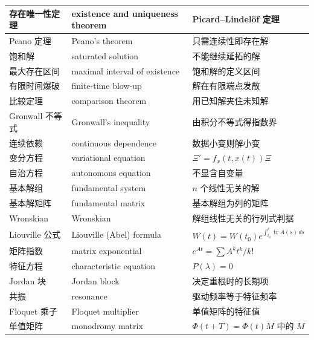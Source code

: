 \documentclass[UTF8,11pt,a4paper]{ctexart}
\begin{document}
\begin{longtable}{@{}>{\raggedright\arraybackslash}p{2.9cm}>{\raggedright\arraybackslash}p{4.7cm}>{\raggedright\arraybackslash}p{7.0cm}@{}}
存在唯一性定理 & existence and uniqueness theorem & Picard--Lindel\"of 定理 \\
\hline
Peano 定理 & Peano's theorem & 只需连续性即存在解 \\
\hline
饱和解 & saturated solution & 不能继续延拓的解 \\
最大存在区间 & maximal interval of existence & 饱和解的定义区间 \\
\hline
有限时间爆破 & finite-time blow-up & 解在有限端点发散 \\
\hline
比较定理 & comparison theorem & 用已知解夹住未知解 \\
\hline
Gronwall 不等式 & Gronwall's inequality & 由积分不等式得指数界 \\
\hline
连续依赖 & continuous dependence & 数据小变则解小变 \\
\hline
变分方程 & variational equation & $\Xi'=f_x(t,x(t))\Xi$ \\
自治方程 & autonomous equation & 不显含自变量 \\
\hline
\hline
基本解组 & fundamental system & $n$ 个线性无关的解 \\
基本解矩阵 & fundamental matrix & 基本解组为列的矩阵 \\
\hline
Wronskian & Wronskian & 解组线性无关的行列式判据 \\
\hline
Liouville 公式 & Liouville (Abel) formula & $W(t)=W(t_0)e^{\int_{t_0}^t\operatorname{tr}A(s)\,ds}$ \\
\hline
矩阵指数 & matrix exponential & $e^{At}=\sum A^kt^k/k!$ \\
\hline
特征方程 & characteristic equation & $P(\lambda)=0$ \\
\hline
Jordan 块 & Jordan block & 决定重根时的长期项 \\
\hline
共振 & resonance & 驱动频率等于特征频率 \\
\hline
Floquet 乘子 & Floquet multiplier & 单值矩阵的特征值 \\
单值矩阵 & monodromy matrix & $\Phi(t+T)=\Phi(t)M$ 中的 $M$ \\
\hline
\bottomrule
\end{longtable}
\normalsize\renewcommand{\arraystretch}{1}
\end{document}
